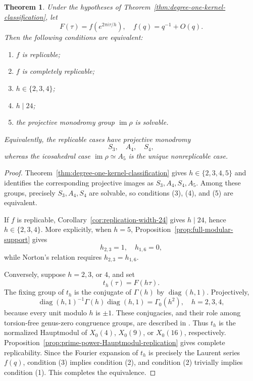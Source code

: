 \documentclass[11pt]{amsart}
\newtheorem{thm}{Theorem}[section]
\theoremstyle{definition}
\theoremstyle{remark}
\numberwithin{equation}{section}
\begin{document}
\begin{thm}\label{thm:degree-one-replicability-classification}
Under the hypotheses of Theorem~\ref{thm:degree-one-kernel-classification}, let
\[
F(\tau)=f(e^{2\pi i\tau/h}),
\quad
f(q)=q^{-1}+O(q).
\]
Then the following conditions are equivalent:
\begin{enumerate}
\item $f$ is replicable;
\item $f$ is completely replicable;
\item $h\in\{2,3,4\}$;
\item $h\mid24$;
\item the projective monodromy group $\operatorname{im}\rho$ is solvable.
\end{enumerate}
Equivalently, the replicable cases have projective monodromy
\[
S_3,\quad A_4,\quad S_4,
\]
whereas the icosahedral case $\operatorname{im}\rho\simeq A_5$ is the unique nonreplicable case.
\end{thm}

\begin{proof}
Theorem~\ref{thm:degree-one-kernel-classification} gives $h\in\{2,3,4,5\}$ and identifies the corresponding projective images as $S_3,A_4,S_4,A_5$.  Among these groups, precisely $S_3,A_4,S_4$ are solvable, so conditions (3), (4), and (5) are equivalent.

If $f$ is replicable, Corollary~\ref{cor:replication-width-24} gives $h\mid24$, hence $h\in\{2,3,4\}$.  More explicitly, when $h=5$, Proposition~\ref{prop:full-modular-support} gives
\[
h_{2,3}=1,
\quad
h_{1,6}=0,
\]
while Norton's relation requires $h_{2,3}=h_{1,6}$.

Conversely, suppose $h=2,3$, or $4$, and set
\[
t_h(\tau)=F(h\tau).
\]
The fixing group of $t_h$ is the conjugate of $\Gamma(h)$ by $\operatorname{diag}(h,1)$.  Projectively,
\[
\operatorname{diag}(h,1)^{-1}\Gamma(h)\operatorname{diag}(h,1)
=
\Gamma_0(h^2),
\quad h=2,3,4,
\]
because every unit modulo $h$ is $\pm1$.  These conjugacies, and their role among torsion-free genus-zero congruence groups, are described in \cite{sebbar-duke}.  Thus $t_h$ is the normalized Hauptmodul of $X_0(4)$, $X_0(9)$, or $X_0(16)$, respectively.  Proposition~\ref{prop:prime-power-Hauptmodul-replication} gives complete replicability.  Since the Fourier expansion of $t_h$ is precisely the Laurent series $f(q)$, condition (3) implies condition (2), and condition (2) trivially implies condition (1).  This completes the equivalence.
\end{proof}
\end{document}
